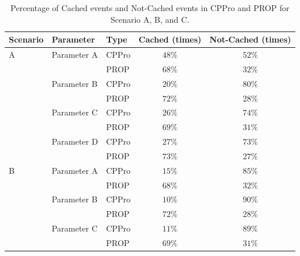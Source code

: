 \documentclass[10pt,final,journal,a4paper]{IEEEtran}
\begin{document}
\begin{table}[!t]
\caption{Percentage of Cached events and Not-Cached events in CPPro and PROP for Scenario A, B, and C.}
\label{tab:stacked1sca}
\centering
\begin{tabular}{|l|l|l|c|c|}
\hline
Scenario & Parameter & Type & Cached (times)& Not-Cached (times) \\ %
\hline
A & Parameter A & CPPro &  $48\%$ & $52\%$ \\%
\hline
 &  & PROP & $68\%$ & $32\%$ \\ %
\hline

& Parameter B & CPPro & $20\%$ & $80\%$ \\ %
\hline
& & PROP & $72\%$ & $28\%$ \\%
\hline
& Parameter C & CPPro & $26\%$ & $74\%$  \\%
\hline
 & & PROP & $69\%$ & $31\%$ \\%
\hline

& Parameter D & CPPro & $27\%$ & $73\%$  \\%
\hline
 & & PROP & $73\%$ & $27\%$ \\%
\hline

B & Parameter A & CPPro &  $15\%$ & $85\%$ \\%
\hline
 &  & PROP & $68\%$ & $32\%$ \\ %
\hline

& Parameter B & CPPro & $10\%$ & $90\%$ \\ %
\hline
& & PROP & $72\%$ & $28\%$ \\%
\hline
& Parameter C & CPPro & $11\%$ & $89\%$  \\%
\hline
 & & PROP & $69\%$ & $31\%$ \\%
\hline


\end{tabular}
\end{table}
\end{document}
